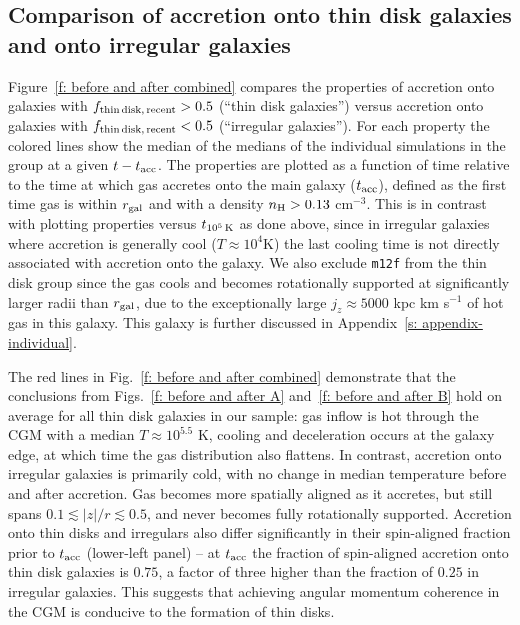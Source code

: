 \documentclass[fleqn,usenatbib]{mnras}
\newcommand{\fthin}{f_{\rm thin\,disk,\,recent}}
\newcommand{\tcools}{t_{10^5\,{\rm K}}}
\newcommand{\tacc}{t_{\rm acc}}
\begin{document}
\subsection{Comparison of accretion onto thin disk galaxies and onto irregular galaxies}
\label{s: thin vs irregular}

Figure~\ref{f: before and after combined} compares the properties of accretion onto galaxies with $\fthin > 0.5$ (``thin disk galaxies'') versus accretion onto galaxies with $\fthin < 0.5$ (``irregular galaxies'').
For each property the colored lines show the median of the medians of the individual simulations in the group at a given $t - \tacc$.
The properties are plotted as a function of time relative to the time at which gas accretes onto the main galaxy ($\tacc$), defined as the first time gas is within $r_{\rm gal}$ and with a density $n_{\rm H} > 0.13$ cm$^{-3}$.
This is in contrast with plotting properties versus $\tcools$ as done above, since in irregular galaxies where accretion is generally cool ($T\approx10^4$K) the last cooling time is not directly associated with accretion onto the galaxy. 
We also exclude \texttt{m12f} from the thin disk group since the gas cools and becomes rotationally supported at significantly larger radii than $r_{\rm gal}$, due to the exceptionally large $j_z\approx5000$ kpc km s$^{-1}$ of hot gas in this galaxy.
This galaxy is further discussed in Appendix~\ref{s: appendix-individual}. 

The red lines in Fig.~\ref{f: before and after combined} demonstrate that the conclusions from Figs.~\ref{f: before and after A} and~\ref{f: before and after B} hold on average for all thin disk galaxies in our sample:
gas inflow is hot through the CGM with a median $T \approx 10^{5.5}$ K,
cooling and deceleration occurs at the galaxy edge,
at which time the gas distribution also flattens.
In contrast, accretion onto irregular galaxies is primarily cold, with no change in median temperature before and after accretion.
Gas becomes more spatially aligned as it accretes, but still spans $0.1 \lesssim \vert z \vert / r \lesssim 0.5$, and never becomes fully rotationally supported.
Accretion onto thin disks and irregulars also differ significantly in their spin-aligned fraction  prior to $\tacc$ (lower-left panel) -- at $\tacc$ the fraction of spin-aligned accretion onto thin disk galaxies is $0.75$, a factor of three higher than the fraction of $0.25$ in irregular galaxies.
This suggests that achieving angular momentum coherence in the CGM is conducive to the formation of thin disks. 
\end{document}
